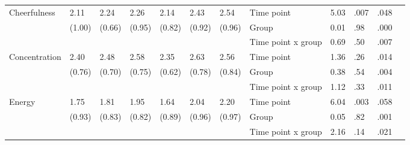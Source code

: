 \documentclass[authordate, empirical,issue]{jote-new-article}
\begin{document}
\begin{table}[th!]
\begin{fullwidth}
{\begin{tabular}{@{} l l l l l l l | l l l l l @{}}
        \hline Cheerfulness                            & 2.11                                          & 2.24                 & 2.26                 & 2.14          & 2.43                                  & 2.54   & Time point         & 5.03 & .007 & .048 \\
                                                       & (1.00)                                        & (0.66)               & (0.95)               & (0.82)        & (0.92)                                & (0.96) & Group              & 0.01 & .98  & .000 \\
                                                       &                                               &                      &                      &               &                                       &        & Time point x group & 0.69 & .50  & .007 \\

        \hline Concentration                           & 2.40                                          & 2.48                 & 2.58                 & 2.35          & 2.63                                  & 2.56   & Time point         & 1.36 & .26  & .014 \\
                                                       & (0.76)                                        & (0.70)               & (0.75)               & (0.62)        & (0.78)                                & (0.84) & Group              & 0.38 & .54  & .004 \\
                                                       &                                               &                      &                      &               &                                       &        & Time point x group & 1.12 & .33  & .011 \\

        \hline Energy                                  & 1.75                                          & 1.81                 & 1.95                 & 1.64          & 2.04                                  & 2.20   & Time point         & 6.04 & .003 & .058 \\
                                                       & (0.93)                                        & (0.83)               & (0.82)               & (0.89)        & (0.96)                                & (0.97) & Group              & 0.05 & .82  & .001 \\
                                                       &                                               &                      &                      &               &                                       &        & Time point x group & 2.16 & .14  & .021 \\



\end{tabular}}
\end{fullwidth}
\end{table}
\end{document}
